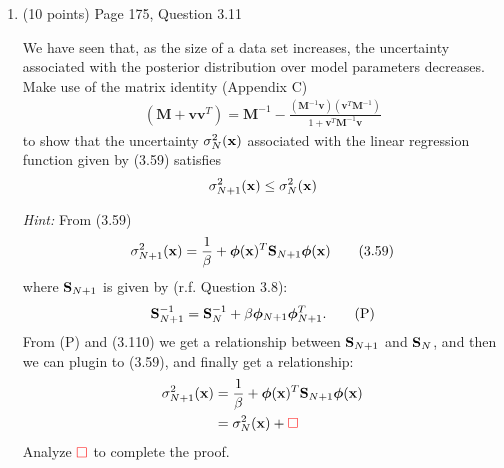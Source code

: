\documentclass[11pt]{article}
\begin{document}
\begin{enumerate}
\item (10 points) Page 175, Question 3.11
\begin{framed}
We have seen that, as the size of a data set increases, the uncertainty associated with the posterior distribution over model parameters decreases. Make use of the matrix identity (Appendix C)
\begin{align*}
(\mathbf M + \mathbf v \mathbf v^T)
= \mathbf M^{-1} - 
\frac{(\mathbf M^{-1} \mathbf v) (\mathbf v^T \mathbf M^{-1}) }
{1 + \mathbf v^T \mathbf M^{-1} \mathbf v}
\tag{3.110}
\end{align*}
to show that the uncertainty $\sigma^2_N (\mathbf{x})$ associated with the linear regression function given by (3.59) satisfies
$$\sigma_{N+1}^2 (\mathbf{x}) \leq \sigma_{N}^2 (\mathbf{x})$$
\end{framed}

\textit{Hint:} From (3.59) 
\begin{align}
\sigma_{N+1}^2 (\mathbf{x}) = \frac{1}{\beta} + \bm{\phi}(\mathbf{x})^T \mathbf{S}_{N+1} \bm{\phi}(\mathbf{x}) \tag{3.59}
\end{align}
where $\mathbf{S}_{N+1}$ is given by (r.f. Question 3.8):
\begin{align}
\mathbf{S}_{N+1}^{-1} = \mathbf{S}_N^{-1} + \beta \bm{\phi}_{N+1} \bm{\phi}_{N+1}^T. \tag{P}
\end{align}
From (P) and (3.110) we get a relationship between $\mathbf{S}_{N+1}$ and $\mathbf{S}_{N}$, and then we can plugin to (3.59), and finally get a relationship: 
\begin{align*}
\sigma_{N+1}^2 (\mathbf{x}) &= \frac{1}{\beta} + \bm{\phi}(\mathbf{x})^T \mathbf{S}_{N+1} \bm{\phi}(\mathbf{x}) \\
                     &= \sigma_{N}^2 (\mathbf{x}) + {\color{red}\square}
\end{align*}
Analyze ${\color{red}\square}$ to complete the proof. 



\end{enumerate}
\end{document}
